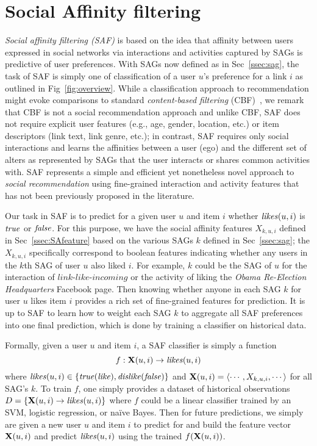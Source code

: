 
\section{Social Affinity filtering}

\emph{Social affinity filtering (SAF)} is based on the idea that
affinity between users expressed in social networks via interactions
and activities captured by SAGs is predictive of user preferences.
With SAGs now defined as in Sec~\ref{ssec:sag}, the task of SAF is
simply one of classification of a user $u$'s preference for a link $i$
as outlined in Fig~\ref{fig:overview}.  While a classification
approach to recommendation might evoke comparisons to standard
\emph{content-based filtering} (CBF)~\cite{newsweeder}, we remark that
CBF is not a social recommendation approach and unlike CBF, SAF does
not require explicit user features (e.g., age, gender, location, etc.)
or item descriptors (link text, link genre, etc.); in contrast, SAF
requires only social interactions and learns the affinities between a
user (ego) and the different set of alters as represented by SAGs that
the user interacts or shares common activities with.  SAF represents a
simple and efficient yet nonetheless novel approach to \emph{social
  recommendation} using fine-grained interaction and activity features
that has not been previously proposed in the literature.

Our task in SAF is to predict for a given user $u$ and item $i$
whether $\likes(u,i)$ is $\true$ or $\false$.  For this purpose,
we have the social affinity features $X_{k,u,i}$ defined in 
Sec~\ref{ssec:SAfeature} based on the various SAGs $k$ defined in 
Sec~\ref{ssec:sag}; the $X_{k,u,i}$ specifically correspond to boolean 
features indicating whether any users in the $k$th SAG of
user $u$ also liked $i$.  For example, $k$ could be the SAG of $u$ for
the interaction of $\textit{link-like-incoming}$ or the activity of
liking the {\em Obama Re-Election Headquarters} Facebook page.  Then knowing whether
anyone in each SAG $k$ for user $u$ likes item $i$ provides a rich set
of fine-grained features for prediction.  It is up to SAF to learn how
to weight each SAG $k$ to aggregate all SAF preferences into one final
prediction, which is done by training a classifier on historical data.

Formally, given a user $u$ and item $i$, a SAF classifier is simply a
function $$f: \x(u,i) \to \likes(u,i)$$ where $\likes(u,i) \in \{ \true
(\like), \dislike (\false) \}$ and $\x(u,i) = \langle
\cdots,X_{k,u,i},\cdots \rangle$ for all SAG's $k$.  To train $f$, one
simply provides a dataset of historical observations $D = \{ 
\x(u,i) \to \likes(u,i) \}$ where $f$ could be a linear
classifier trained by an SVM, logistic regression, or na\"{i}ve Bayes.
Then for future predictions, we simply are given a new user $u$ and
item $i$ to predict for and build the feature vector $\x(u,i)$ and 
predict $\likes(u,i)$ using the trained $f(\x(u,i))$.

